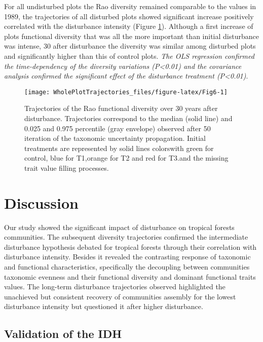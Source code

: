 \documentclass[fleqn,10pt]{ArtEcoFoG} %
\theoremstyle{definition}
\theoremstyle{definition}
\theoremstyle{definition}
\theoremstyle{remark}
\begin{document}
For all undisturbed plots the Rao diversity remained comparable to the
values in 1989, the trajectories of all disturbed plots showed
significant increase positively correlated with the disturbance
intensity (Figure \ref{fig:Fig6}). Although a first increase of plots
functional diversity that was all the more important than initial
disturbance was intense, 30 after disturbance the diversity was similar
among disturbed plots and significantly higher than this of control
plots. \emph{The OLS regression confirmed the time-dependency of the
diversity variations (P\textless{}0.01) and the covariance analysis
confirmed the significant effect of the disturbance treatment
(P\textless{}0.01)}.

\begin{figure}

{\centering \texttt{[image: WholePlotTrajectories\_files/figure-latex/Fig6-1]} 

}

\caption{Trajectories of the Rao functional diversity over 30 years after disturbance. Trajectories correspond to the median (solid line) and 0.025 and 0.975 percentile (gray envelope) observed after 50 iteration of the taxonomic uncertainty propagation. Initial treatments are represented by solid lines colorswith green for control, blue for T1,orange for T2 and red for T3.and the missing trait value filling processes.}\label{fig:Fig6}
\end{figure}

\section{Discussion}\label{discussion}

Our study showed the significant impact of disturbance on tropical
forests communities. The subsequent diversity trajectories confirmed the
intermediate disturbance hypothesis debated for tropical forests through
their correlation with disturbance intensity. Besides it revealed the
contrasting response of taxonomic and functional characteristics,
specifically the decoupling between communities taxonomic evenness and
their functional diversity and dominant functional traits values. The
long-term disturbance trajectories observed highlighted the unachieved
but consistent recovery of communities assembly for the lowest
disturbance intensity but questioned it after higher disturbance.

\subsection{Validation of the IDH}\label{validation-of-the-idh}
\end{document}
